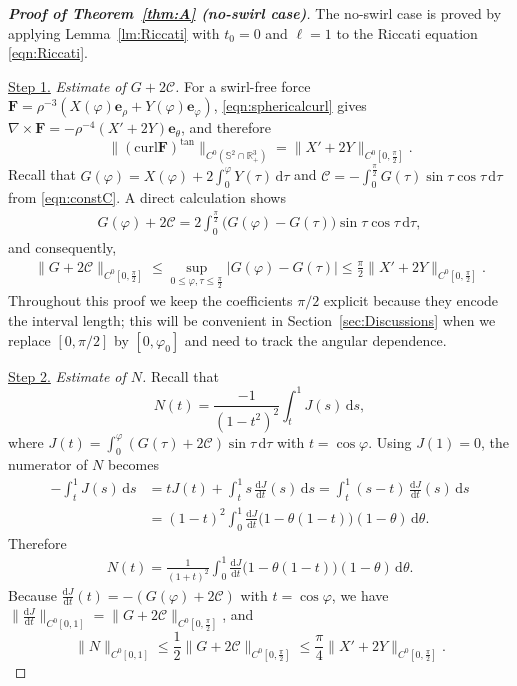 \documentclass{amsart}
\newcommand{\curl}{\mathrm{curl}}
\newcommand{\vp}{\varphi}
\newcommand{\Be}{{\boldsymbol{e}}}
\newcommand{\BF}{{\boldsymbol{F}}}
\newcommand{\mcC}{\mathcal{C}}
\newcommand{\rmd}{\mathrm{d}}
\begin{document}
\begin{proof}[\textbf{Proof of Theorem~\ref{thm:A} (no-swirl case)}]
The no-swirl case is proved by applying Lemma~\ref{lm:Riccati} with $t_0=0$ and $\ell=1$ to the Riccati equation \eqref{eqn:Riccati}.

\noindent
\underline{Step 1.} \emph{Estimate of $G+2\mcC$.}
For a swirl-free force $\BF = \rho^{-3}(X(\varphi)\Be_\rho + Y(\varphi)\Be_\varphi)$,
\eqref{eqn:sphericalcurl} gives $\nabla\times\BF = -\rho^{-4}(X'+2Y)\Be_\theta$,
and therefore
\[
\|(\curl\BF)^{\tan}\|_{C^0(\mathbb{S}^2\cap\mathbb{R}^3_+)} = \|X'+2Y\|_{C^0[0,\frac{\pi}{2}]}.
\]
Recall that $G(\vp)=X(\vp)+2\int_0^\vp Y(\tau)\, \rmd\tau$ and $\mcC=-\int_0^{\frac{\pi}{2}}G(\tau)\sin\tau \cos\tau \, \rmd\tau$ from \eqref{eqn:constC}.
A direct calculation shows
\begin{align}\label{eqn:Gand2C}
G(\vp)+2\mcC 
= 2\int_0^{\frac{\pi}{2}} \bigl(G(\vp)-G(\tau)\bigr)\sin\tau \cos\tau\, \rmd\tau,
\end{align}
and consequently,
\begin{align*}
\|G+2\mcC\|_{C^0[0,\frac{\pi}{2}]} 
\le \sup_{0 \le \vp,\tau \le \frac{\pi}{2}} |G(\vp)-G(\tau)|
\le \frac{\pi}{2} \|X'+2Y\|_{ C^0[0, \frac{\pi}{2}] }.
\end{align*}
Throughout this proof we keep the coefficients $\pi/2$ explicit because they encode the interval length; this will be convenient in Section~\ref{sec:Discussions} when we replace $[0,\pi/2]$ by $[0,\varphi_0]$ and need to track the angular dependence.

\noindent
\underline{Step 2.} \emph{Estimate of $N$.}
Recall that
\[
N(t)=\frac{-1}{(1-t^2)^2} \int_t^1 J(s) \, \rmd s,
\]
where $J(t)=\int_0^{\vp} (G(\tau) +2\mcC) \sin \tau \, \rmd\tau$ with $t=\cos\vp$.
Using $J(1)=0$, the numerator of $N$ becomes
\begin{equation*}
\begin{aligned}
- \int_t^1 J(s)\, \mathrm{d}s
&= t J(t) + \int_t^1 s \,\frac{\mathrm{d}J}{\mathrm{d}t}(s) \, \mathrm{d}s
= \int_t^1 (s-t)\, \frac{\mathrm{d}J}{\mathrm{d}t}(s)\, \mathrm{d}s \\
&= (1-t)^2 \int_0^1 \frac{\mathrm{d}J}{\mathrm{d}t}\bigl( 1-\theta(1-t) \bigr)(1-\theta) \, \mathrm{d}\theta .
\end{aligned}
\end{equation*}
Therefore
\begin{align}\label{eqn:NandJprime}
N(t) = \frac{1}{(1+t)^2}\int_0^1 \frac{\mathrm{d}J}{\mathrm{d}t}\bigl( 1-\theta(1-t)\bigr)(1-\theta) \, \rmd\theta.
\end{align}
Because $\frac{\mathrm{d}J}{\mathrm{d}t}(t) = -(G(\vp)+2\mcC)$ with $t=\cos\vp$, we have $\bigl\|\frac{\mathrm{d}J}{\mathrm{d}t}\bigr\|_{C^0[0,1]} = \|G+2\mcC\|_{C^0[0,\frac{\pi}2]}$, and
\[
\|N\|_{C^0[0,1]} \le \frac12 \|G+2\mcC\|_{C^0[0,\frac{\pi}{2}]} \le \frac{\pi}{4} \|X'+2Y\|_{ C^0[0, \frac{\pi}{2}] }.
\]


\end{proof}
\end{document}
